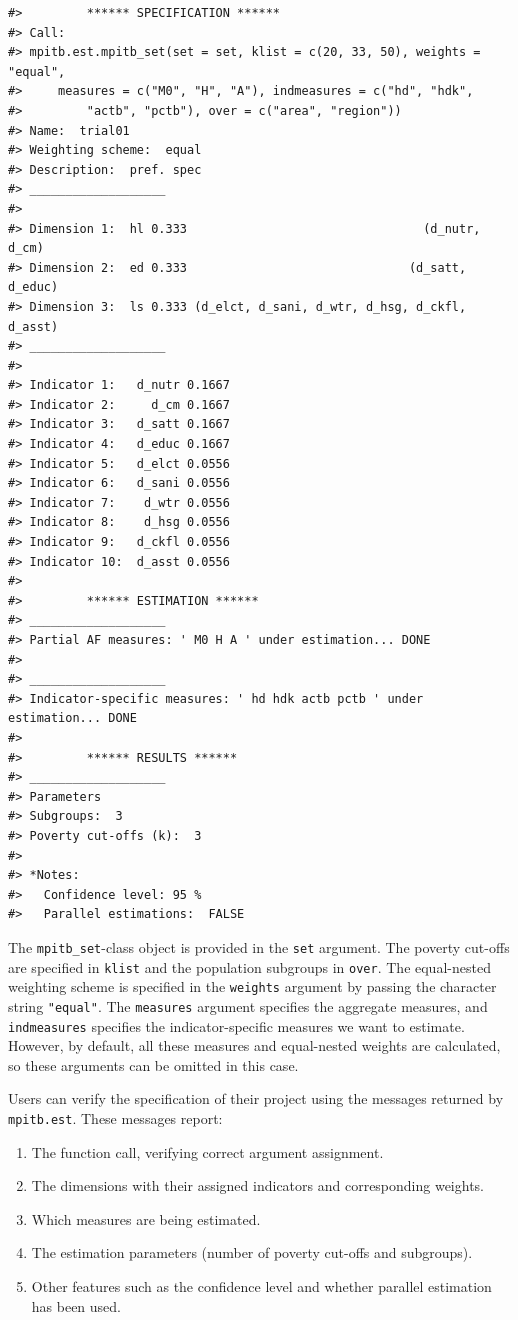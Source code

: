 \begin{verbatim}
#>         ****** SPECIFICATION ******
#> Call:
#> mpitb.est.mpitb_set(set = set, klist = c(20, 33, 50), weights = "equal", 
#>     measures = c("M0", "H", "A"), indmeasures = c("hd", "hdk", 
#>         "actb", "pctb"), over = c("area", "region"))
#> Name:  trial01 
#> Weighting scheme:  equal 
#> Description:  pref. spec 
#> ___________________
#>                                                                      
#> Dimension 1:  hl 0.333                                 (d_nutr, d_cm)
#> Dimension 2:  ed 0.333                               (d_satt, d_educ)
#> Dimension 3:  ls 0.333 (d_elct, d_sani, d_wtr, d_hsg, d_ckfl, d_asst)
#> ___________________
#>                             
#> Indicator 1:   d_nutr 0.1667
#> Indicator 2:     d_cm 0.1667
#> Indicator 3:   d_satt 0.1667
#> Indicator 4:   d_educ 0.1667
#> Indicator 5:   d_elct 0.0556
#> Indicator 6:   d_sani 0.0556
#> Indicator 7:    d_wtr 0.0556
#> Indicator 8:    d_hsg 0.0556
#> Indicator 9:   d_ckfl 0.0556
#> Indicator 10:  d_asst 0.0556
#> 
#>         ****** ESTIMATION ******
#> ___________________
#> Partial AF measures: ' M0 H A ' under estimation... DONE
#> 
#> ___________________
#> Indicator-specific measures: ' hd hdk actb pctb ' under estimation... DONE
#> 
#>         ****** RESULTS ******
#> ___________________
#> Parameters
#> Subgroups:  3 
#> Poverty cut-offs (k):  3 
#> 
#> *Notes: 
#>   Confidence level: 95 %
#>   Parallel estimations:  FALSE
\end{verbatim}

The \texttt{mpitb\_set}-class object is provided in the \texttt{set} argument. The poverty cut-offs are specified in \texttt{klist} and the population subgroups in \texttt{over}. The equal-nested weighting scheme is specified in the \texttt{weights} argument by passing the character string \texttt{"equal"}. The \texttt{measures} argument specifies the aggregate measures, and \texttt{indmeasures} specifies the indicator-specific measures we want to estimate. However, by default, all these measures and equal-nested weights are calculated, so these arguments can be omitted in this case.

Users can verify the specification of their project using the messages returned by \texttt{mpitb.est}. These messages report:

\begin{enumerate}
\def\labelenumi{\arabic{enumi}.}
\tightlist
\item
  The function call, verifying correct argument assignment.
\item
  The dimensions with their assigned indicators and corresponding weights.
\item
  Which measures are being estimated.
\item
  The estimation parameters (number of poverty cut-offs and subgroups).
\item
  Other features such as the confidence level and whether parallel estimation has been used.
\end{enumerate}

